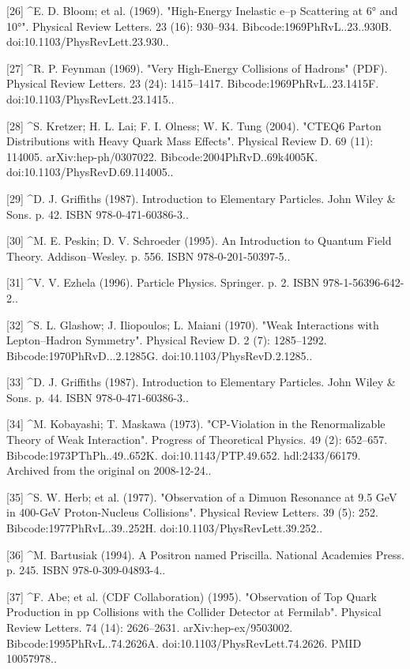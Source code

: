 [26]
^E. D. Bloom; et al. (1969). "High-Energy Inelastic e–p Scattering at 6° and 10°". Physical Review Letters. 23 (16): 930–934. Bibcode:1969PhRvL..23..930B. doi:10.1103/PhysRevLett.23.930..

[27]
^R. P. Feynman (1969). "Very High-Energy Collisions of Hadrons" (PDF). Physical Review Letters. 23 (24): 1415–1417. Bibcode:1969PhRvL..23.1415F. doi:10.1103/PhysRevLett.23.1415..

[28]
^S. Kretzer; H. L. Lai; F. I. Olness; W. K. Tung (2004). "CTEQ6 Parton Distributions with Heavy Quark Mass Effects". Physical Review D. 69 (11): 114005. arXiv:hep-ph/0307022. Bibcode:2004PhRvD..69k4005K. doi:10.1103/PhysRevD.69.114005..

[29]
^D. J. Griffiths (1987). Introduction to Elementary Particles. John Wiley & Sons. p. 42. ISBN 978-0-471-60386-3..

[30]
^M. E. Peskin; D. V. Schroeder (1995). An Introduction to Quantum Field Theory. Addison–Wesley. p. 556. ISBN 978-0-201-50397-5..

[31]
^V. V. Ezhela (1996). Particle Physics. Springer. p. 2. ISBN 978-1-56396-642-2..

[32]
^S. L. Glashow; J. Iliopoulos; L. Maiani (1970). "Weak Interactions with Lepton–Hadron Symmetry". Physical Review D. 2 (7): 1285–1292. Bibcode:1970PhRvD...2.1285G. doi:10.1103/PhysRevD.2.1285..

[33]
^D. J. Griffiths (1987). Introduction to Elementary Particles. John Wiley & Sons. p. 44. ISBN 978-0-471-60386-3..

[34]
^M. Kobayashi; T. Maskawa (1973). "CP-Violation in the Renormalizable Theory of Weak Interaction". Progress of Theoretical Physics. 49 (2): 652–657. Bibcode:1973PThPh..49..652K. doi:10.1143/PTP.49.652. hdl:2433/66179. Archived from the original on 2008-12-24..

[35]
^S. W. Herb; et al. (1977). "Observation of a Dimuon Resonance at 9.5 GeV in 400-GeV Proton-Nucleus Collisions". Physical Review Letters. 39 (5): 252. Bibcode:1977PhRvL..39..252H. doi:10.1103/PhysRevLett.39.252..

[36]
^M. Bartusiak (1994). A Positron named Priscilla. National Academies Press. p. 245. ISBN 978-0-309-04893-4..

[37]
^F. Abe; et al. (CDF Collaboration) (1995). "Observation of Top Quark Production in pp Collisions with the Collider Detector at Fermilab". Physical Review Letters. 74 (14): 2626–2631. arXiv:hep-ex/9503002. Bibcode:1995PhRvL..74.2626A. doi:10.1103/PhysRevLett.74.2626. PMID 10057978..

